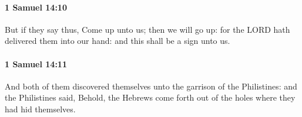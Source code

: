 		\paragraph{1 Samuel 14:10} %
			\label{1SAMUEL-14-10}

			But if they say thus, Come up unto us; then we will go up: for the LORD hath delivered them into our hand: and this shall be a sign unto us.


		\paragraph{1 Samuel 14:11} %
			\label{1SAMUEL-14-11}

			And both of them discovered themselves unto the garrison of the Philistines: and the Philistines said, Behold, the Hebrews come forth out of the holes where they had hid themselves.



